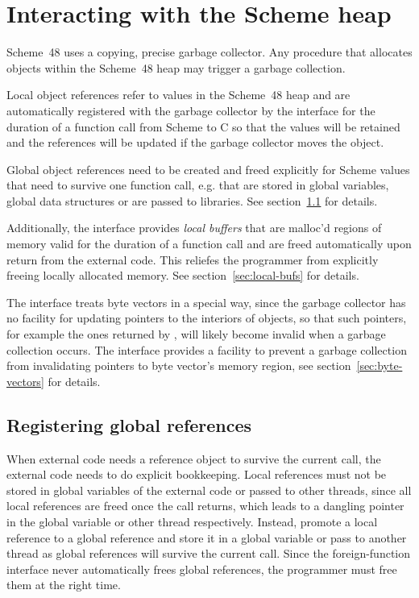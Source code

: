 \section{Interacting with the Scheme heap}
\label{sec:heap-allocation}
\label{gc}

Scheme~48 uses a copying, precise garbage collector.
Any procedure that allocates objects within the Scheme~48 heap may trigger
 a garbage collection.

Local object references refer to values in the Scheme~48 heap and are
 automatically registered with the garbage collector by the interface
 for the duration of a function call from Scheme to C so that the
 values will be retained and the references will be updated if the
 garbage collector moves the object.

Global object references need to be created and freed explicitly for
 Scheme values that need to survive one function call, e.g. that are
 stored in global variables, global data structures or are passed to
 libraries.  See section~\ref{sec:global-references} for details.

Additionally, the interface provides \emph{local buffers} that are malloc'd regions
 of memory valid for the duration of a function call and are freed automatically upon
 return from the external code.  This reliefes the programmer from explicitly freeing
 locally allocated memory.  See section~\ref{sec:local-bufs} for details.

The interface treats byte vectors in a special way, since the garbage
 collector has no facility for updating pointers to the interiors of
 objects, so that such pointers, for example the ones returned by
 , will likely become
 invalid when a garbage collection occurs.  The interface provides a
 facility to prevent a garbage collection from invalidating pointers to
 byte vector's memory region, see section~\ref{sec:byte-vectors} for 
 details.

\subsection{Registering global references}
\label{sec:global-references}

When external code needs a reference object to survive the current
call, the external code needs to do explicit bookkeeping.  Local
references must not be stored in global variables of the external code
or passed to other threads, since all local references are freed once
the call returns, which leads to a dangling pointer in the global
variable or other thread respectively.  Instead, promote a local
reference to a global reference and store it in a global variable or
pass to another thread as global references will survive the current
call.  Since the foreign-function interface never automatically frees
global references, the programmer must free them at the right time.

